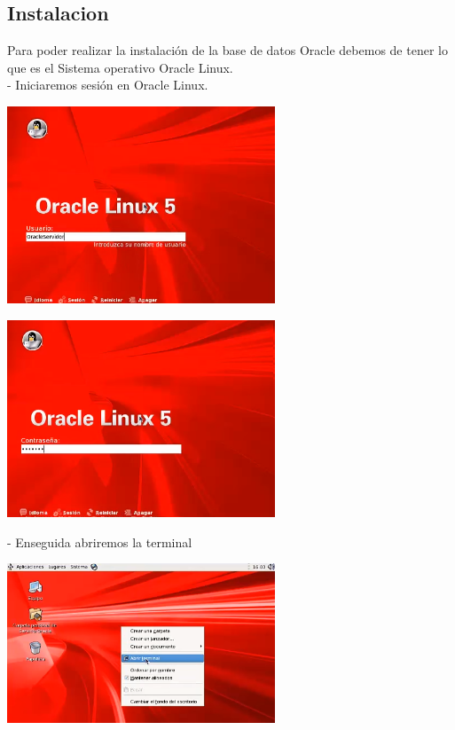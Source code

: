 \documentclass[12pt,letterpaper]{article}
\begin{document}
\subsection{Instalacion}
Para poder realizar la instalación de la base de datos Oracle debemos de tener lo que es el Sistema operativo Oracle Linux. \\
- Iniciaremos sesión en Oracle Linux. \\
\begin{center}
\includegraphics[width=8cm]{IMGORACLE/img02.png}
\end{center}

\begin{center}
\includegraphics[width=8cm]{IMGORACLE/img03.png} 
\end{center}
- Enseguida abriremos la terminal \\

\begin{center}
\includegraphics[width=8cm]{IMGORACLE/img04.png} 
\end{center}
\end{document}
